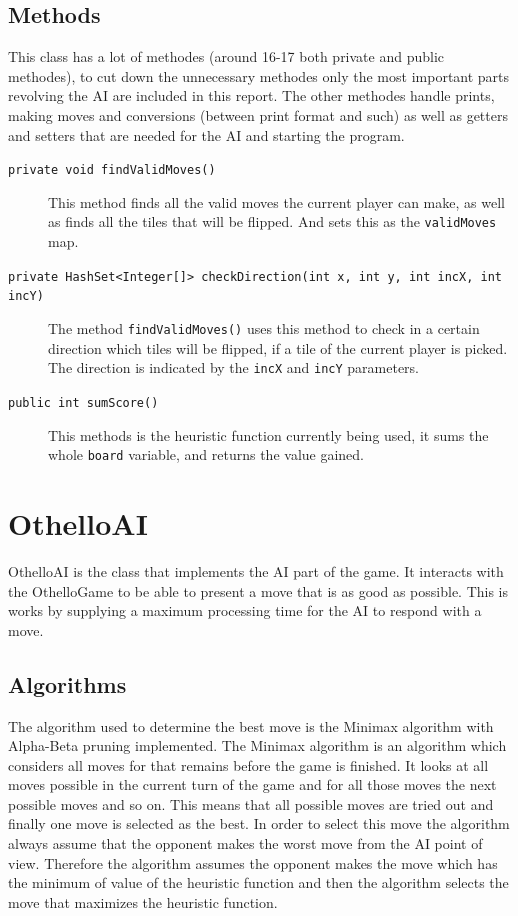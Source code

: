 \documentclass[a4paper]{article}
\begin{document}
\subsection{Methods}
This class has a lot of methodes (around 16-17 both private and public methodes), to cut down the unnecessary methodes only the most important parts revolving the AI are included in this report. The other methodes handle prints, making moves and conversions (between print format and such) as well as getters and setters that are needed for the AI and starting the program.  
\begin{description}
\item[\texttt{private void findValidMoves()}] This method finds all the valid moves the current player can make, as well as finds all the tiles that will be flipped. And sets this as the \texttt{validMoves} map.
\item[\texttt{private HashSet<Integer[]> checkDirection(int x, int y, int incX, int incY)}] The method \texttt{findValidMoves()} uses this method to check in a certain direction which tiles will be flipped, if a tile of the current player is picked. The direction is indicated by the \texttt{incX} and \texttt{incY} parameters.
\item[\texttt{public int sumScore()}] This methods is the heuristic function currently being used, it sums the whole \texttt{board} variable, and returns the value gained.
\end{description} 

\section{OthelloAI}
OthelloAI is the class that implements the AI part of the game. It interacts with the OthelloGame to be able to present a move that is as good as possible. This is works by supplying a maximum processing time for the AI to respond with a move. 

\subsection{Algorithms}
The algorithm used to determine the best move is the Minimax algorithm with Alpha-Beta pruning implemented. The Minimax algorithm is an algorithm which considers all moves for that remains before the game is finished. It looks at all moves possible in the current turn of the game and for all those moves the next possible moves and so on. This means that all possible moves are tried out and finally one move is selected as the best. In order to select this move the algorithm always assume that the opponent makes the worst move from the AI point of view. Therefore the algorithm assumes the opponent makes the move which has the minimum of value of the heuristic function and then the algorithm selects the move that maximizes the heuristic function.
\end{document}
